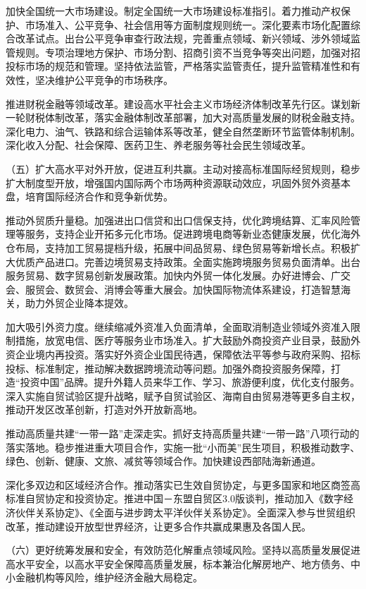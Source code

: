 \documentclass[10pt, UTF8]{ctexbook} %
\begin{document}
加快全国统一大市场建设。制定全国统一大市场建设标准指引。着力推动产权保护、市场准入、公平竞争、社会信用等方面制度规则统一。深化要素市场化配置综合改革试点。出台公平竞争审查行政法规，完善重点领域、新兴领域、涉外领域监管规则。专项治理地方保护、市场分割、招商引资不当竞争等突出问题，加强对招投标市场的规范和管理。坚持依法监管，严格落实监管责任，提升监管精准性和有效性，坚决维护公平竞争的市场秩序。

推进财税金融等领域改革。建设高水平社会主义市场经济体制改革先行区。谋划新一轮财税体制改革，落实金融体制改革部署，加大对高质量发展的财税金融支持。深化电力、油气、铁路和综合运输体系等改革，健全自然垄断环节监管体制机制。深化收入分配、社会保障、医药卫生、养老服务等社会民生领域改革。

（五）扩大高水平对外开放，促进互利共赢。主动对接高标准国际经贸规则，稳步扩大制度型开放，增强国内国际两个市场两种资源联动效应，巩固外贸外资基本盘，培育国际经济合作和竞争新优势。

推动外贸质升量稳。加强进出口信贷和出口信保支持，优化跨境结算、汇率风险管理等服务，支持企业开拓多元化市场。促进跨境电商等新业态健康发展，优化海外仓布局，支持加工贸易提档升级，拓展中间品贸易、绿色贸易等新增长点。积极扩大优质产品进口。完善边境贸易支持政策。全面实施跨境服务贸易负面清单。出台服务贸易、数字贸易创新发展政策。加快内外贸一体化发展。办好进博会、广交会、服贸会、数贸会、消博会等重大展会。加快国际物流体系建设，打造智慧海关，助力外贸企业降本提效。

加大吸引外资力度。继续缩减外资准入负面清单，全面取消制造业领域外资准入限制措施，放宽电信、医疗等服务业市场准入。扩大鼓励外商投资产业目录，鼓励外资企业境内再投资。落实好外资企业国民待遇，保障依法平等参与政府采购、招标投标、标准制定，推动解决数据跨境流动等问题。加强外商投资服务保障，打造“投资中国”品牌。提升外籍人员来华工作、学习、旅游便利度，优化支付服务。深入实施自贸试验区提升战略，赋予自贸试验区、海南自由贸易港等更多自主权，推动开发区改革创新，打造对外开放新高地。

推动高质量共建“一带一路”走深走实。抓好支持高质量共建“一带一路”八项行动的落实落地。稳步推进重大项目合作，实施一批“小而美”民生项目，积极推动数字、绿色、创新、健康、文旅、减贫等领域合作。加快建设西部陆海新通道。

深化多双边和区域经济合作。推动落实已生效自贸协定，与更多国家和地区商签高标准自贸协定和投资协定。推进中国－东盟自贸区3.0版谈判，推动加入《数字经济伙伴关系协定》、《全面与进步跨太平洋伙伴关系协定》。全面深入参与世贸组织改革，推动建设开放型世界经济，让更多合作共赢成果惠及各国人民。

（六）更好统筹发展和安全，有效防范化解重点领域风险。坚持以高质量发展促进高水平安全，以高水平安全保障高质量发展，标本兼治化解房地产、地方债务、中小金融机构等风险，维护经济金融大局稳定。
\end{document}
